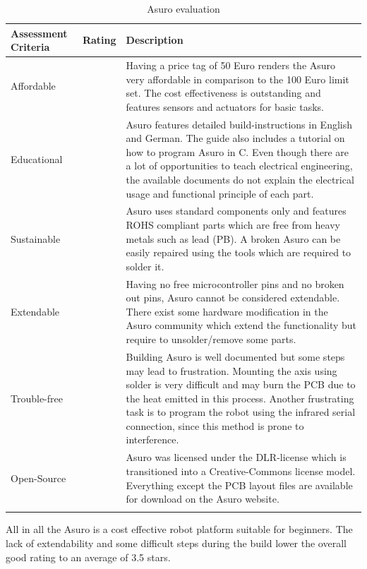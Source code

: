 \begin{longtabu} to \textwidth { X[1,l] X[1,l] X[4,l]}
\toprule
Assessment Criteria    & Rating & Description \\
\midrule
Affordable      &     & Having a price tag of 50 Euro renders the Asuro very affordable in comparison to the 100 Euro limit set. The cost effectiveness is outstanding and features sensors and actuators for basic tasks.     \\
Educational     &      & Asuro features detailed build-instructions in English and German. The guide also includes a tutorial on how to program Asuro in C. Even though there are a lot of opportunities to teach electrical engineering, the available documents do not explain the electrical usage and functional principle of each part. \\
Sustainable       &      & Asuro uses standard components only and features ROHS compliant parts which are free from heavy metals such as lead (PB). A broken Asuro can be easily repaired using the tools which are required to solder it. \\
Extendable &       & Having no free microcontroller pins and no broken out pins, Asuro cannot be considered extendable. There exist some hardware modification in the Asuro community which extend the functionality but require to unsolder/remove some parts.  \\
Trouble-free &  & Building Asuro is well documented but some steps may lead to frustration. Mounting the axis using solder is very difficult and may burn the PCB due to the heat emitted in this process. Another frustrating task is to program the robot using the infrared serial connection, since this method is prone to interference. \\
Open-Source &  & Asuro was licensed under the DLR-license which is transitioned into a Creative-Commons license model. Everything except the PCB layout files are available for download on the Asuro website.\\
\bottomrule
\caption{Asuro evaluation}
\label{tbl:asuro_eval}
\end{longtabu}

All in all the Asuro is a cost effective robot platform suitable for beginners. The lack of extendability and some difficult steps during the build lower the overall good rating to an average of 3.5 stars. 

